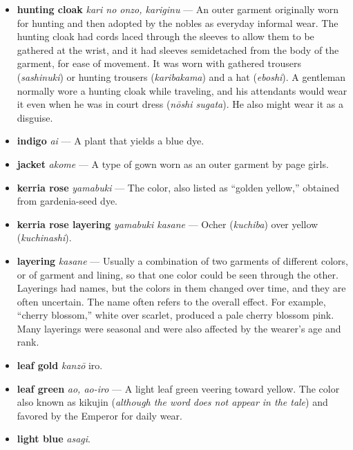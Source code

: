 \documentclass{article}
\begin{document}
\begin{multicols*}{2}
\begin{itemize}[
			label=,
			leftmargin=0em,
			rightmargin=-1.5em,
			itemindent=-2em,
			nosep,
		]
		\item \textbf{hunting cloak} \textit{kari no onzo, kariginu} --- An outer garment originally worn for hunting and then adopted by the nobles as everyday informal wear. The hunting cloak had cords laced through the sleeves to allow them to be gathered at the wrist, and it had sleeves semidetached from the body of the garment, for ease of movement. It was worn with gathered trousers (\textit{sashinuki}) or hunting trousers (\textit{karibakama}) and a hat (\textit{eboshi}). A gentleman normally wore a hunting cloak while traveling, and his attendants would wear it even when he was in court dress (\textit{nōshi sugata}). He also might wear it as a disguise.

		\item \textbf{indigo} \textit{ai} --- A plant that yields a blue dye.

		\item \textbf{jacket} \textit{akome} --- A type of gown worn as an outer garment by page girls.

		\item \textbf{kerria rose} \textit{yamabuki} --- The color, also listed as “golden yellow,” obtained from gardenia-seed dye.

		\item \textbf{kerria rose layering} \textit{yamabuki kasane} --- Ocher (\textit{kuchiba}) over yellow (\textit{kuchinashi}).

		\item \textbf{layering} \textit{kasane} --- Usually a combination of two garments of different colors, or of garment and lining, so that one color could be seen through the other. Layerings had names, but the colors in them changed over time, and they are often uncertain. The name often refers to the overall effect. For example, “cherry blossom,” white over scarlet, produced a pale cherry blossom pink. Many layerings were seasonal and were also affected by the wearer's age and rank.

		\item \textbf{leaf gold} \textit{kanzō} iro.

		\item \textbf{leaf green} \textit{ao, ao-iro} --- A light leaf green veering toward yellow. The color also known as kikujin (\textit{although the word does not appear in the tale}) and favored by the Emperor for daily wear.

		\item \textbf{light blue} \textit{asagi}.


\end{itemize}
\end{multicols*}
\end{document}
